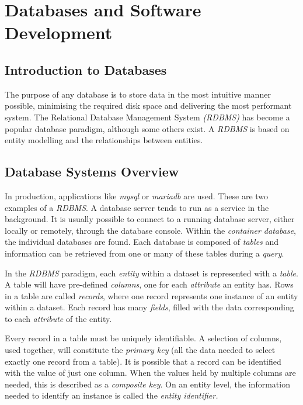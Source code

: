 \documentclass[10pt]{article}
\let\oldsection\section
\renewcommand\section{\clearpage\oldsection}
\begin{document}
\section{Databases and Software Development}
\label{sec:org9c5eee8}
\subsection{Introduction to Databases}
\label{sec:org2a7d951}

The purpose of any database is to store data in the most intuitive manner possible, minimising the required disk space and delivering the most performant system. The Relational Database Management System \emph{(RDBMS)} has become a popular database paradigm, although some others exist. A \emph{RDBMS} is based on entity modelling and the relationships between entities.

\subsection{Database Systems Overview}
\label{sec:org4cd7d7a}

In production, applications like \emph{mysql} or \emph{mariadb} are used. These are two examples of a \emph{RDBMS}. A database server tends to run as a service in the background. It is usually possible to connect to a running database server, either locally or remotely, through the database console. Within the \emph{container database}, the individual databases are found. Each database is composed of \emph{tables} and information can be retrieved from one or many of these tables during a \emph{query}.

In the \emph{RDBMS} paradigm, each \emph{entity} within a dataset is represented with a \emph{table}. A table will have pre-defined \emph{columns}, one for each \emph{attribute} an entity has. Rows in a table are called \emph{records}, where one record represents one instance of an entity within a dataset. Each record has many \emph{fields}, filled with the data corresponding to each \emph{attribute} of the entity.

Every record in a table must be uniquely identifiable. A selection of columns, used together, will constitute the \emph{primary key} (all the data needed to select exactly one record from a table). It is possible that a record can be identified with the value of just one column. When the values held by multiple columns are needed, this is described as a \emph{composite key}. On an entity level, the information needed to identify an instance is called the \emph{entity identifier.}
\end{document}
